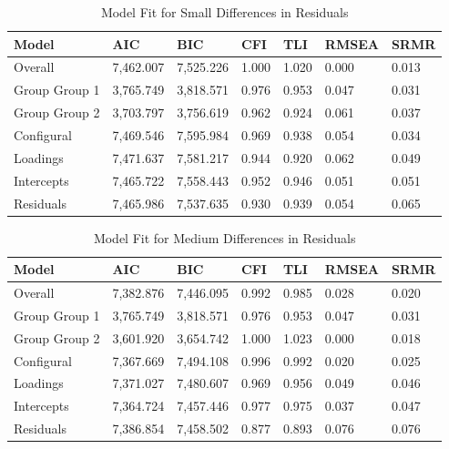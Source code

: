 \documentclass[
  man,floatsintext]{apa7}
\begin{document}
\begin{table}[tbp]

\begin{center}
\begin{threeparttable}

\caption{\label{tab:tab8}Model Fit for Small Differences in Residuals}

\begin{tabular}{lllllll}
\toprule
Model & AIC & BIC & CFI & TLI & RMSEA & SRMR\\
\midrule
Overall & 7,462.007 & 7,525.226 & 1.000 & 1.020 & 0.000 & 0.013\\
Group Group 1 & 3,765.749 & 3,818.571 & 0.976 & 0.953 & 0.047 & 0.031\\
Group Group 2 & 3,703.797 & 3,756.619 & 0.962 & 0.924 & 0.061 & 0.037\\
Configural & 7,469.546 & 7,595.984 & 0.969 & 0.938 & 0.054 & 0.034\\
Loadings & 7,471.637 & 7,581.217 & 0.944 & 0.920 & 0.062 & 0.049\\
Intercepts & 7,465.722 & 7,558.443 & 0.952 & 0.946 & 0.051 & 0.051\\
Residuals & 7,465.986 & 7,537.635 & 0.930 & 0.939 & 0.054 & 0.065\\
\bottomrule
\end{tabular}

\end{threeparttable}
\end{center}

\end{table}

\begin{table}[tbp]

\begin{center}
\begin{threeparttable}

\caption{\label{tab:tab9}Model Fit for Medium Differences in Residuals}

\begin{tabular}{lllllll}
\toprule
Model & AIC & BIC & CFI & TLI & RMSEA & SRMR\\
\midrule
Overall & 7,382.876 & 7,446.095 & 0.992 & 0.985 & 0.028 & 0.020\\
Group Group 1 & 3,765.749 & 3,818.571 & 0.976 & 0.953 & 0.047 & 0.031\\
Group Group 2 & 3,601.920 & 3,654.742 & 1.000 & 1.023 & 0.000 & 0.018\\
Configural & 7,367.669 & 7,494.108 & 0.996 & 0.992 & 0.020 & 0.025\\
Loadings & 7,371.027 & 7,480.607 & 0.969 & 0.956 & 0.049 & 0.046\\
Intercepts & 7,364.724 & 7,457.446 & 0.977 & 0.975 & 0.037 & 0.047\\
Residuals & 7,386.854 & 7,458.502 & 0.877 & 0.893 & 0.076 & 0.076\\
\bottomrule
\end{tabular}

\end{threeparttable}
\end{center}

\end{table}
\end{document}
